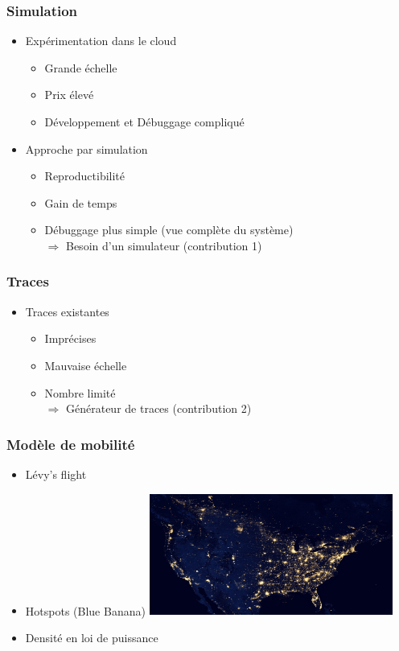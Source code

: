 \documentclass{beamer}
\begin{document}
\begin{frame}
  \normalsize
  \frametitle{Simulation}
  \begin{itemize}
    \item{Expérimentation dans le cloud}
    \begin{itemize}
      \item{Grande échelle}
      \item{Prix élevé}
      \item{Développement et Débuggage compliqué\vspace{5mm}}
    \end{itemize}
    \item{Approche par simulation}
    \begin{itemize}
      \item{Reproductibilité}
      \item{Gain de temps}
      \item{Débuggage plus simple (vue complète du système)\\[5mm]
        \hspace{5mm}$\Rightarrow$ Besoin d'un simulateur (contribution 1)}
    \end{itemize}
  \end{itemize}
\end{frame}

\begin{frame}
  \frametitle{Traces}
  \begin{itemize}
    \item{Traces existantes}
      \begin{itemize}
        \item{Imprécises}
        \item{Mauvaise échelle}
        \item{Nombre limité\\[0.5cm]\hspace{0.5cm}$\Rightarrow$ Générateur de traces (contribution 2)}
      \end{itemize}
  \end{itemize}
\end{frame}

\begin{frame}
  \frametitle{Modèle de mobilité}
  \begin{itemize}
    \item{Lévy's flight}
    \item{Hotspots (Blue Banana)\vspace{2mm}}
    \includegraphics[width=8cm]{usa_by_night.jpg}\\
    \item{Densité en loi de puissance}
  \end{itemize}
\end{frame}
\end{document}
